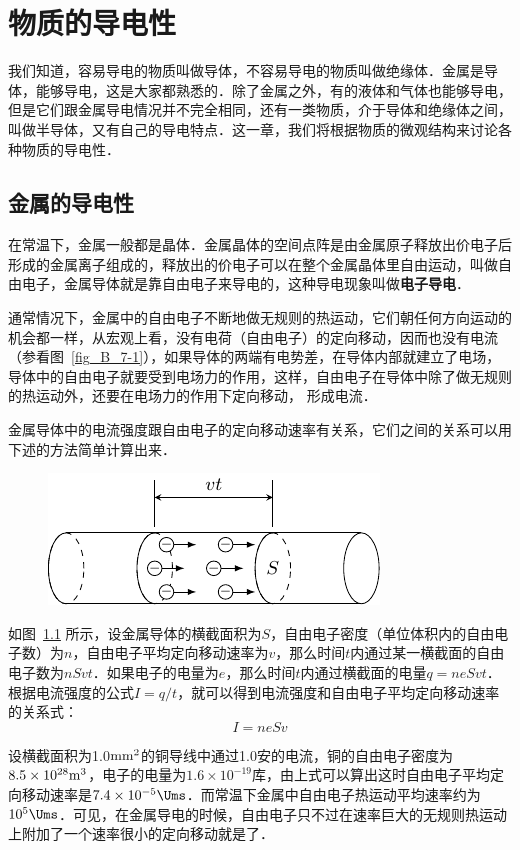\chapter{物质的导电性}\label{chapter-conductivity-of-matter}

我们知道，容易导电的物质叫做导体，不容易导电的物质叫做绝缘体．金属是导体，能够导电，这是大家都熟悉的．除了金属之外，有的液体和气体也能够导电，但是它们跟金属导电情况并不完全相同，还有一类物质，介于导体和绝缘体之间，叫做半导体，又有自己的导电特点．这一章，我们将根据物质的微观结构来讨论各种物质的导电性．

\section{金属的导电性}

在常温下，金属一般都是晶体．金属晶体的空间点阵是由金属原子释放出价电子后形成的金属离子组成的，释放出的价电子可以在整个金属晶体里自由运动，叫做自由电子，金属导体就是靠自由电子来导电的，这种导电现象叫做\textbf{电子导电}．


通常情况下，金属中的自由电子不断地做无规则的热运动，它们朝任何方向运动的机会都一样，从宏观上看，没有电荷（自由电子）的定向移动，因而也没有电流（参看图~\ref{fig_B_7-1}），如果导体的两端有电势差，在导体内部就建立了电场，导体中的自由电子就要受到电场力的作用，这样，自由电子在导体中除了做无规则的热运动外，还要在电场力的作用下定向移动，
形成电流．

金属导体中的电流强度跟自由电子的定向移动速率有关系，它们之间的关系可以用下述的方法简单计算出来．
\begin{figure}[htbp]
    \centering
    \includegraphics{fig/B/8-1.pdf}
    \caption{}\label{fig_B_8-1}
\end{figure}

如图~\ref{fig_B_8-1} 所示，设金属导体的横截面积为$S$，自由电子密度（单位体积内的自由电子数）为$n$，自由电子平均定向移动速率为$v$，那么时间$t$内通过某一横截面的自由电子数为$nSvt$．如果电子的电量为$e$，那么时间$t$内通过横截面的电量$q=neSvt$．根据电流强度的公式$I=q/t$，就可以得到电流强度和自由电子平均定向移动速率的关系式：
\[I=neSv\]

设横截面积为1.0${\rm mm}^2$的铜导线中通过1.0安的电流，铜的自由电子密度为$8.5\times10^{28}{\rm m}^3$，电子的电量为$1.6\times10^{-19}$库，由上式可以算出这时自由电子平均定向移动速率是$7. 4\times10^{-5}\Ums$．而常温下金属中自由电子热运动平均速率约为$10^5\Ums$．可见，在金属导电的时候，自由电子只不过在速率巨大的无规则热运动上附加了一个速率很小的定向移动就是了．

